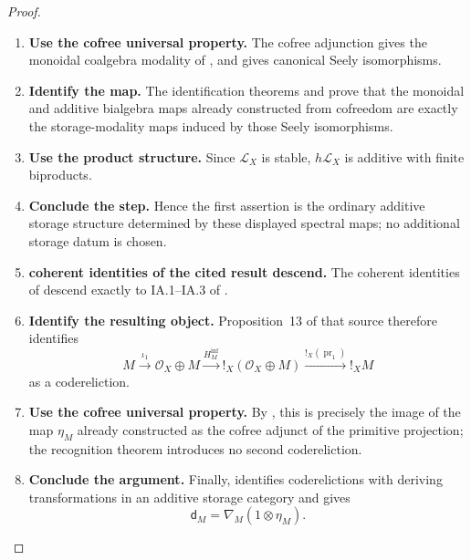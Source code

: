 \begin{proof}
\leavevmode
\begin{enumerate}[label=\textup{(\arabic*)}]
    \item \textbf{Use the cofree universal property.}
    The cofree adjunction gives the monoidal coalgebra modality of
    , and 
    gives canonical Seely isomorphisms.

    \item \textbf{Identify the map.}
    The identification theorems  and
     prove that the monoidal and additive
    bialgebra maps already constructed from cofreedom are exactly the storage-modality maps
    induced by those Seely isomorphisms.

    \item \textbf{Use the product structure.}
    Since \(\mathcal L_X\) is stable, \(h\mathcal L_X\) is additive with finite biproducts.

    \item \textbf{Conclude the step.}
    Hence the first assertion is the ordinary additive storage structure determined by these
    displayed spectral maps; no additional storage datum is chosen.

    \item \textbf{coherent identities of the cited result descend.}
    The coherent identities of  descend
    exactly to \textup{IA.1}--\textup{IA.3} of \cite[Definition~10]{Lemay2021Coderelictions}.

    \item \textbf{Identify the resulting object.}
    Proposition~13 of that source therefore identifies
    \[
        M\xrightarrow{\iota_1}\mathcal O_X\oplus M
        \xrightarrow{H^{\inf}_M}!_X(\mathcal O_X\oplus M)
        \xrightarrow{!_X(\operatorname{pr}_1)}!_XM
    \]
    as a codereliction.

    \item \textbf{Use the cofree universal property.}
    By , this is precisely the image of the map \(\eta_M\)
    already constructed as the cofree adjunct of the primitive projection; the recognition
    theorem introduces no second codereliction.

    \item \textbf{Conclude the argument.}
    Finally, \cite[Theorem~8]{Lemay2021Coderelictions} identifies coderelictions with deriving
    transformations in an additive storage category and gives
    \[
        \mathsf d_M=\nabla_M(1\otimes\eta_M).
    \]


\end{enumerate}
\end{proof}
